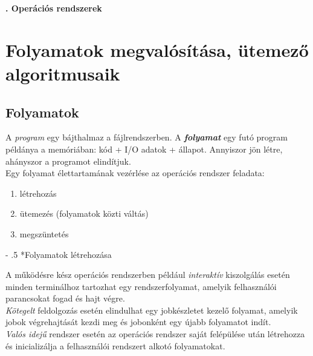 \documentclass[tikz,12pt,margin=0px]{article}
\makeatletter
\renewcommand\paragraph{%
	\@startsection{paragraph}{4}{0mm}%
	{-\baselineskip}%
	{.5\baselineskip}%
	{\normalfont\normalsize\bfseries}}
\makeatother
\begin{document}
    \thispagestyle{fancy}

    \begin{center}
        {\Large\bfseries{}. Operációs rendszerek} \\
    \end{center}

	\section*{Folyamatok megvalósítása, ütemező algoritmusaik}
	
    \subsection*{Folyamatok}

    A \emph{program} egy bájthalmaz a fájlrendszerben. A \emph{\textbf{folyamat}} egy futó program példánya a memóriában: kód + I/O adatok + állapot. Annyiszor jön létre, ahányszor a programot elindítjuk.\\

    \noindent Egy folyamat élettartamának vezérlése az operációs rendszer feladata:

    \begin{enumerate}[topsep=8pt,itemsep=4pt,partopsep=4pt, parsep=4pt]
        \item létrehozás
        \item ütemezés (folyamatok közti váltás)
        \item megszüntetés
    \end{enumerate}

    \paragraph*{Folyamatok létrehozása}

    A működésre kész operációs rendszerben például \emph{interaktív} kiszolgálás esetén minden terminálhoz tartozhat egy rendszerfolyamat, amelyik felhasználói parancsokat fogad és hajt végre.\\
    
    \noindent \emph{Kötegelt} feldolgozás esetén elindulhat egy jobkészletet kezelő folyamat, amelyik jobok végrehajtását kezdi meg és jobonként egy újabb folyamatot indít.\\
    
    \noindent \emph{Valós idejű} rendszer esetén az operációs rendszer saját felépülése után létrehozza és inicializálja a felhasználói rendszert alkotó folyamatokat.\\
\end{document}
